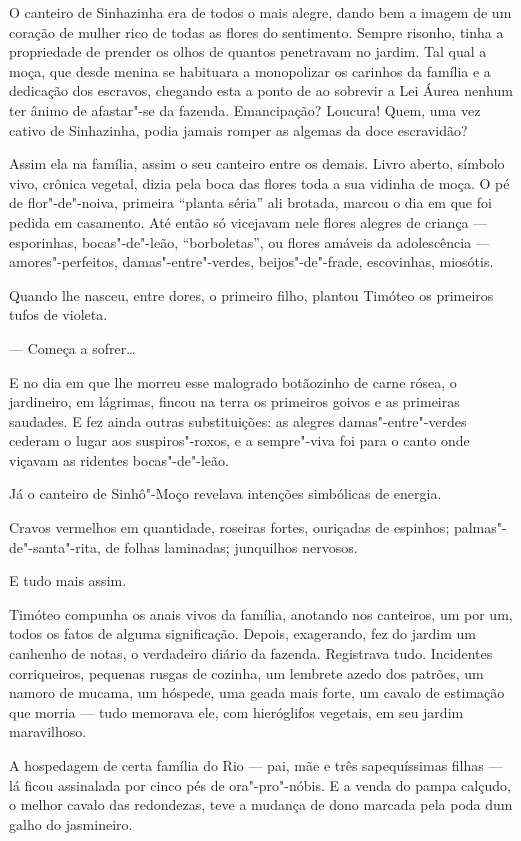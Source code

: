 O canteiro de Sinhazinha era de todos o mais alegre, dando bem a imagem
de um coração de mulher rico de todas as flores do sentimento. Sempre
risonho, tinha a propriedade de prender os olhos de quantos penetravam
no jardim. Tal qual a moça, que desde menina se habituara a monopolizar
os carinhos da família e a dedicação dos escravos, chegando esta a ponto
de ao sobrevir a Lei Áurea nenhum ter ânimo de afastar"-se da fazenda.
Emancipação? Loucura! Quem, uma vez cativo de Sinhazinha, podia jamais
romper as algemas da doce escravidão?

Assim ela na família, assim o seu canteiro entre os demais. Livro
aberto, símbolo vivo, crônica vegetal, dizia pela boca das flores toda a
sua vidinha de moça. O pé de flor"-de"-noiva, primeira ``planta séria''
ali brotada, marcou o dia em que foi pedida em casamento. Até então só
vicejavam nele flores alegres de criança --- esporinhas, bocas"-de"-leão,
``borboletas'', ou flores amáveis da adolescência --- amores"-perfeitos,
damas"-entre"-verdes, beijos"-de"-frade, escovinhas, miosótis.

Quando lhe nasceu, entre dores, o primeiro filho, plantou Timóteo os
primeiros tufos de violeta.

--- Começa a sofrer\ldots{}

E no dia em que lhe morreu esse malogrado botãozinho de carne rósea, o
jardineiro, em lágrimas, fincou na terra os primeiros goivos e as
primeiras saudades. E fez ainda outras substituições: as alegres
damas"-entre"-verdes cederam o lugar aos suspiros"-roxos, e a sempre"-viva
foi para o canto onde viçavam as ridentes bocas"-de"-leão.

Já o canteiro de Sinhô"-Moço revelava intenções simbólicas de energia.

Cravos vermelhos em quantidade, roseiras fortes, ouriçadas de espinhos;
palmas"-de"-santa"-rita, de folhas laminadas; junquilhos nervosos.

E tudo mais assim.

Timóteo compunha os anais vivos da família, anotando nos canteiros, um
por um, todos os fatos de alguma significação. Depois, exagerando, fez
do jardim um canhenho de notas, o verdadeiro diário da fazenda.
Registrava tudo. Incidentes corriqueiros, pequenas rusgas de cozinha, um
lembrete azedo dos patrões, um namoro de mucama, um hóspede, uma geada
mais forte, um cavalo de estimação que morria --- tudo memorava ele, com
hieróglifos vegetais, em seu jardim maravilhoso.

A hospedagem de certa família do Rio --- pai, mãe e três sapequíssimas
filhas --- lá ficou assinalada por cinco pés de ora"-pro"-nóbis. E a venda
do pampa calçudo, o melhor cavalo das redondezas, teve a mudança de dono
marcada pela poda dum galho do jasmineiro.

